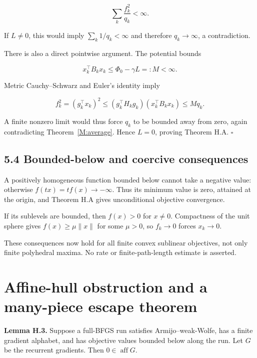 \documentclass[10pt,oneside,openany]{book}
\theoremstyle{remark}\newtheorem{remark}{Remark}[chapter]
\begin{document}
\[
\sum_k\frac{f_k^2}{q_k}<\infty.
\]

If \(L\ne0\), this would imply \(\sum_k1/q_k<\infty\) and therefore
\(q_k\to\infty\), a contradiction.

There is also a direct pointwise argument. The potential bounds

\[
x_k^\top B_kx_k\le\Phi_0-\gamma L=:M<\infty.
\]

Metric Cauchy--Schwarz and Euler's identity imply

\[
f_k^2=(g_k^\top x_k)^2
\le(g_k^\top H_kg_k)(x_k^\top B_kx_k)
\le Mq_k.
\]

A finite nonzero limit would thus force \(q_k\) to be bounded away from
zero, again contradicting Theorem~\ref{M:average}. Hence \(L=0\), proving Theorem H.A.
\(\square\)

\subsection{5.4 Bounded-below and coercive
consequences}\label{H:bounded-below-and-coercive-consequences}

A positively homogeneous function bounded below cannot take a negative
value: otherwise \(f(tx)=tf(x)\to-\infty\). Thus its minimum value is
zero, attained at the origin, and Theorem H.A gives unconditional
objective convergence.

If its sublevels are bounded, then \(f(x)>0\) for \(x\ne0\). Compactness
of the unit sphere gives \(f(x)\ge\mu\|x\|\) for some \(\mu>0\), so
\(f_k\to0\) forces \(x_k\to0\).

These consequences now hold for all finite convex sublinear objectives,
not only finite polyhedral maxima. No rate or finite-path-length
estimate is asserted.


\setcounter{section}{5}
\setcounter{theorem}{0}
\setcounter{lemma}{0}
\setcounter{corollary}{0}
\setcounter{proposition}{0}
\setcounter{remark}{0}
\setcounter{equation}{0}
\section{Affine-hull obstruction and a many-piece escape
theorem}\label{H:affine-hull-obstruction-and-a-many-piece-escape-theorem}

\textbf{Lemma H.3.} Suppose a full-BFGS run satisfies Armijo--weak-Wolfe,
has a finite gradient alphabet, and has objective values bounded below
along the run. Let \(G\) be the recurrent gradients. Then
\(0\in\operatorname{aff}G\).
\end{document}
